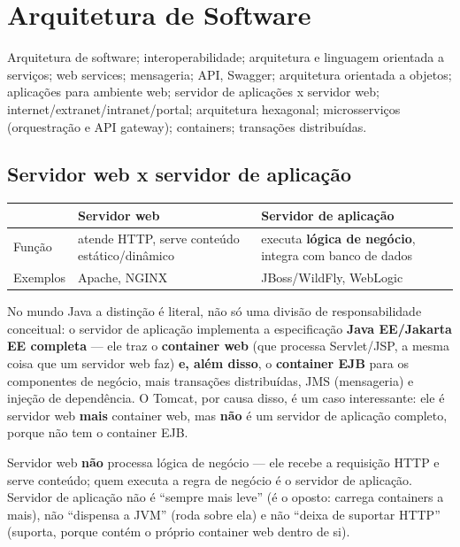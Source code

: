 \chapter{Arquitetura de Software}
\label{cap:arquitetura-teoria}

\begin{edital}
Arquitetura de software; interoperabilidade; arquitetura e linguagem
orientada a serviços; web services; mensageria; API, Swagger; arquitetura
orientada a objetos; aplicações para ambiente web; servidor de aplicações x
servidor web; internet/extranet/intranet/portal; arquitetura hexagonal;
microsserviços (orquestração e API gateway); containers; transações
distribuídas.
\end{edital}

\section{Servidor web x servidor de aplicação}

\begin{conceito}
\begin{center}
\begin{tabular}{@{}p{2.4cm}p{4.6cm}p{4.6cm}@{}}
\toprule
& \textbf{Servidor web} & \textbf{Servidor de aplicação} \\
\midrule
Função & atende HTTP, serve conteúdo estático/dinâmico & executa
\textbf{lógica de negócio}, integra com banco de dados \\
Exemplos & Apache, NGINX & JBoss/WildFly, WebLogic \\
\bottomrule
\end{tabular}
\end{center}

No mundo Java a distinção é literal, não só uma divisão de responsabilidade
conceitual: o servidor de aplicação implementa a especificação
\textbf{Java EE/Jakarta EE completa} --- ele traz o \textbf{container web}
(que processa Servlet/JSP, a mesma coisa que um servidor web faz)
\textbf{e, além disso}, o \textbf{container EJB} para os componentes de
negócio, mais transações distribuídas, JMS (mensageria) e injeção de
dependência. O Tomcat, por causa disso, é um caso interessante: ele é
servidor web \textbf{mais} container web, mas \textbf{não} é um servidor de
aplicação completo, porque não tem o container EJB.
\end{conceito}

\begin{cuidado}
Servidor web \textbf{não} processa lógica de negócio --- ele recebe a
requisição HTTP e serve conteúdo; quem executa a regra de negócio é o
servidor de aplicação. Servidor de aplicação não é “sempre mais leve”
(é o oposto: carrega containers a mais), não “dispensa a JVM” (roda sobre
ela) e não “deixa de suportar HTTP” (suporta, porque contém o próprio
container web dentro de si).
\end{cuidado}

